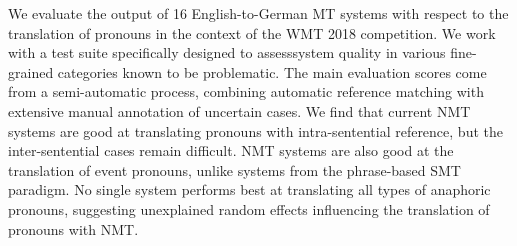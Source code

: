 We evaluate the output of 16 English-to-German MT systems with respect to the translation of pronouns in the context of the WMT 2018 competition. We work with a test suite specifically designed to assesssystem quality in various fine-grained categories known to be problematic. The main evaluation scores come from a semi-automatic process, combining automatic reference matching with extensive manual annotation of uncertain cases. We find that current NMT systems are good at translating pronouns with intra-sentential reference, but the inter-sentential cases remain difficult. NMT systems are also good at the translation of event pronouns, unlike systems from the phrase-based SMT paradigm. No single system performs best at translating all types of anaphoric pronouns, suggesting unexplained random effects influencing the translation of pronouns with NMT.
